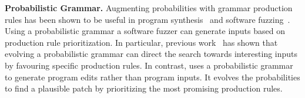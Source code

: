 {\bf Probabilistic Grammar.} Augmenting probabilities with grammar production rules has been shown to be useful in program synthesis~\cite{bhaisaheb23,Ruyi20} and software fuzzing~\cite{Eberlein20,Soremekun22}. Using a probabilistic grammar a software fuzzer can generate inputs based on production rule prioritization. In particular, previous work~\cite{Soremekun22} has shown that evolving a probabilistic grammar can direct the search towards interesting inputs by favouring specific production rules. In contrast, \tool uses a probabilistic grammar to generate program edits rather than program inputs. It evolves the probabilities to find a plausible patch by prioritizing the most promising production rules. 
